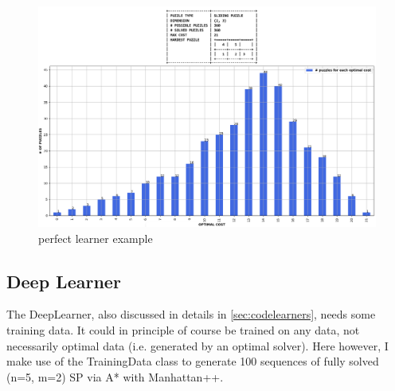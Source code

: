 \begin{figure}[H]
\centering
\includegraphics[scale=0.45]{./Figures/exampleperfectlearner}
\caption[Examples]{perfect learner example}
\label{fig:exampleperfectlearner}
\end{figure}


\subsection{Deep Learner}
\label{DLSS}
The DeepLearner, also discussed in details in \ref{sec:codelearners}, needs some training data. It could in principle of course be trained on any data, not necessarily optimal data (i.e. generated by an optimal solver). Here however, I make use of the TrainingData class to generate 100 sequences of fully solved (n=5, m=2) SP via A{*} with Manhattan++.


\afblue
